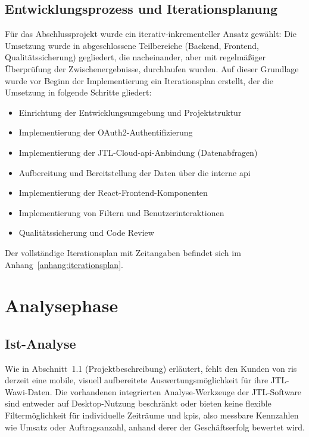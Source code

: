 \documentclass[11pt, a4paper, oneside]{report}
\begin{document}
\section{Entwicklungsprozess und Iterationsplanung}

Für das Abschlussprojekt wurde ein iterativ-inkrementeller Ansatz gewählt: Die Umsetzung
wurde in abgeschlossene Teilbereiche (Backend, Frontend, Qualitätssicherung) gegliedert,
die nacheinander, aber mit regelmäßiger Überprüfung der Zwischenergebnisse, durchlaufen
wurden. Auf dieser Grundlage wurde vor Beginn der Implementierung ein Iterationsplan
erstellt, der die Umsetzung in folgende Schritte gliedert:

\begin{itemize}[leftmargin=1.5em]
  \item Einrichtung der Entwicklungsumgebung und Projektstruktur
  \item Implementierung der OAuth2-Authentifizierung
  \item Implementierung der JTL-Cloud-\gls{api}-Anbindung (Datenabfragen)
  \item Aufbereitung und Bereitstellung der Daten über die interne \gls{api}
  \item Implementierung der React-Frontend-Komponenten
  \item Implementierung von Filtern und Benutzerinteraktionen
  \item Qualitätssicherung und Code Review
\end{itemize}

Der vollständige Iterationsplan mit Zeitangaben befindet sich im Anhang~\ref{anhang:iterationsplan}.

\chapter{Analysephase}

\section{Ist-Analyse}

Wie in Abschnitt~1.1 (Projektbeschreibung) erläutert, fehlt den Kunden von \gls{ris}
derzeit eine mobile, visuell aufbereitete Auswertungsmöglichkeit für ihre JTL-Wawi-Daten.
Die vorhandenen integrierten Analyse-Werkzeuge der JTL-Software sind entweder auf Desktop-Nutzung beschränkt
oder bieten keine flexible Filtermöglichkeit für individuelle Zeiträume und \glspl{kpi}, also messbare Kennzahlen wie Umsatz oder Auftragsanzahl, anhand derer der Geschäftserfolg bewertet wird.
\end{document}
